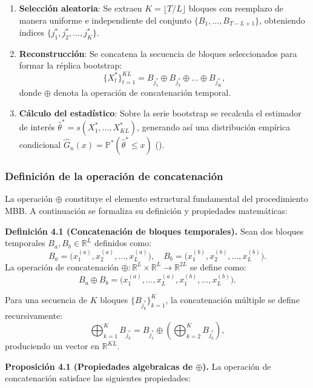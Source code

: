 \documentclass[
  spanish,
  us-letterpaper,
]{scrreprt}
\providecommand{\tightlist}{%
  \setlength{\itemsep}{0pt}\setlength{\parskip}{0pt}}
\numberwithin{equation}{section}
\begin{document}
\begin{enumerate}
\def\labelenumi{\arabic{enumi}.}
\tightlist
\item
  \textbf{Selección aleatoria}: Se extraen \(K = \lfloor T/L \rfloor\)
  bloques con reemplazo de manera uniforme e independiente del conjunto
  \(\{B_1, \dots, B_{T-L+1}\}\), obteniendo índices
  \(\{j_1^*, j_2^*, \dots, j_K^*\}\).
\item
  \textbf{Reconstrucción}: Se concatena la secuencia de bloques
  seleccionados para formar la réplica bootstrap: \[
  \{X_t^*\}_{t=1}^{KL} = B_{j_1^*} \oplus B_{j_2^*} \oplus \dots \oplus B_{j_K^*},
  \] donde \(\oplus\) denota la operación de concatenación temporal.
\item
  \textbf{Cálculo del estadístico}: Sobre la serie bootstrap se
  recalcula el estimador de interés
  \(\hat{\theta}^* = s(X_1^*, \dots, X_{KL}^*)\), generando así una
  distribución empírica condicional
  \(\hat{G}_n(x) = \mathbb{P}^*(\hat{\theta}^* \leq x)\)
  ().
\end{enumerate}

\subsubsection{Definición de la operación de
concatenación}\label{definiciuxf3n-de-la-operaciuxf3n-de-concatenaciuxf3n}

La operación \(\oplus\) constituye el elemento estructural fundamental
del procedimiento MBB. A continuación se formaliza su definición y
propiedades matemáticas:

\textbf{Definición 4.1 (Concatenación de bloques temporales).} Sean dos
bloques temporales \(B_a, B_b \in \mathbb{R}^L\) definidos como: \[
B_a = \big(x_1^{(a)}, x_2^{(a)}, \dots, x_L^{(a)}\big), \quad B_b = \big(x_1^{(b)}, x_2^{(b)}, \dots, x_L^{(b)}\big).
\] La operación de concatenación
\(\oplus: \mathbb{R}^L \times \mathbb{R}^L \to \mathbb{R}^{2L}\) se
define como: \[
B_a \oplus B_b = \big(x_1^{(a)}, \dots, x_L^{(a)}, x_1^{(b)}, \dots, x_L^{(b)}\big).
\]

Para una secuencia de \(K\) bloques \(\{B_{j_k^*}\}_{k=1}^K\), la
concatenación múltiple se define recursivamente: \[
\bigoplus_{k=1}^K B_{j_k^*} = B_{j_1^*} \oplus \left(\bigoplus_{k=2}^K B_{j_k^*}\right),
\] produciendo un vector en \(\mathbb{R}^{KL}\).

\textbf{Proposición 4.1 (Propiedades algebraicas de \(\oplus\)).} La
operación de concatenación satisface las siguientes propiedades:
\end{document}

